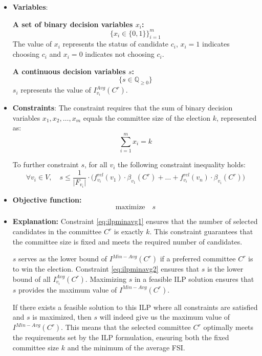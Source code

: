 \documentclass{article}
\begin{document}
\begin{itemize}
  \item \textbf{Variables}: 

\textbf{A set of binary decision variables $x_i$:} \[ \bigg\{ x_i \in \{0, 1\} \bigg\}_{i=1}^m \] The value of $x_i$ represents the status of candidate $c_i$, \(x_i = 1\) indicates choosing $c_i$ and \(x_i = 0\) indicates not choosing $c_i$.


\textbf{A continuous decision variables $s$:} 
\[ \bigg\{ s\in \mathbb{Q}_{\geq 0} \bigg\}\] 
$s_i$ represents the value of $I_{v_i}^{Avg}(C^{r})$.
    \item \textbf{Constraints}:
The constraint requires that the sum of binary decision variables \(x_1, x_2, \ldots, x_m\) equals the committee size of the election \(k\), represented as:
\begin{equation} \sum_{i=1}^m x_i = k     \label{eq:ilpminavg1}
\end{equation}

To further constraint $s$, for all $v_i$ the following constraint inequality holds:
\begin{equation}\forall v_i \in V, \quad
 s \leq \frac{1}{\vert F_{v_i} \vert}\cdot \Big(f_{v_i}^{rel}(v_1) \cdot \beta_{v_1}(C^{r})+\dots+f_{v_i}^{rel}(v_n) \cdot \beta_{v_i}(C^{r})\Big)    \label{eq:ilpminavg2}
\end{equation}
  
  \item  \textbf{Objective function:}
  \[\text{maximize} \quad s\]





 \item  \textbf{Explanation:}
Constraint \ref{eq:ilpminavg1} ensures that the number of selected candidates in the committee \(C^r\) is exactly \(k\). This constraint guarantees that the committee size is fixed and meets the required number of candidates. 

\(s\) serves as the lower bound of $I^{Min-Avg}(C^{r})$ if a preferred committee \(C^r\) is to win the election. Constraint \ref{eq:ilpminavg2} ensures that $s$ is the lower bound of all \(I_{v_i}^{Avg}(C^{r})\). Maximizing \(s\) in a feasible ILP solution ensures that \(s\) provides the maximum value of \(I^{Min-Avg}(C^{r})\). 

If there exists a feasible solution to this ILP where all constraints are satisfied and \(s\) is maximized, then \(s\) will indeed give us the maximum value of \(I^{Min-Avg}(C^{r})\). This means that the selected committee \(C^r\) optimally meets the requirements set by the ILP formulation, ensuring both the fixed committee size \(k\) and the minimum of the average FSI. 






\end{itemize}
\end{document}
